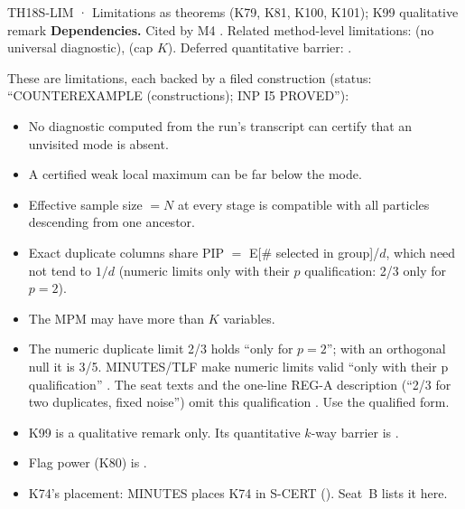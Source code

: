 \begin{card}{TH18}{S-LIM · Limitations as theorems (K79, K81, K100, K101); K99 qualitative remark}
\textbf{Dependencies.} Cited by M4 . Related method-level limitations:  (no universal diagnostic),  (cap $K$). Deferred quantitative barrier: .

\begin{plain}
These are limitations, each backed by a filed construction (status: ``COUNTEREXAMPLE (constructions); INP I5 PROVED''):
\begin{itemize}
\item No diagnostic computed from the run's transcript can certify that an unvisited mode is absent.
\item A certified weak local maximum can be far below the mode.
\item Effective sample size $=N$ at every stage is compatible with all particles descending from one ancestor.
\item Exact duplicate columns share PIP $=$ E[\# selected in group]/$d$, which need not tend to $1/d$ (numeric limits only with their $p$ qualification: 2/3 only for $p=2$).
\item The MPM may have more than $K$ variables.
\end{itemize}
\end{plain}
\begin{notproved}
\begin{itemize}
\item The numeric duplicate limit 2/3 holds ``only for $p=2$''; with an orthogonal null it is 3/5. MINUTES/TLF make numeric limits valid ``only with their p qualification'' . The seat texts and the one-line REG-A description (``2/3 for two duplicates, fixed noise'') omit this qualification . Use the qualified form.
\item K99 is a qualitative remark only. Its quantitative $k$-way barrier is .
\item Flag power (K80) is .
\item K74's placement: MINUTES places K74 in S-CERT (). Seat~B lists it here.
\end{itemize}
\end{notproved}
\end{card}

